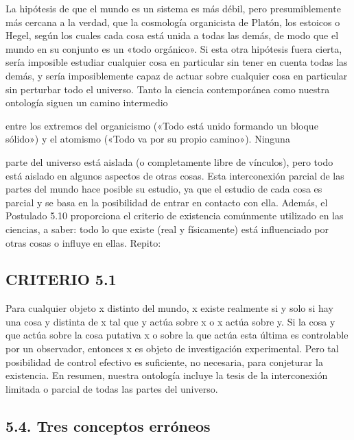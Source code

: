 \begin{justifying}
\begin{justifying}
La hipótesis de que el mundo es un sistema es más débil, pero presumiblemente
más cercana a la verdad, que la cosmología organicista de Platón, los estoicos o
Hegel, según los cuales cada cosa está unida a todas las demás, de modo que
el mundo en su conjunto es un «todo orgánico». Si esta otra hipótesis
fuera cierta, sería imposible estudiar cualquier cosa en particular
sin tener en cuenta todas las demás, y sería imposiblemente
capaz de actuar sobre cualquier cosa en particular sin perturbar todo el
universo.
Tanto la ciencia contemporánea como nuestra ontología siguen un camino intermedio

entre los extremos del organicismo («Todo está unido formando un bloque sólido»)
y el atomismo («Todo va por su propio camino»). Ninguna

parte del universo está aislada (o completamente libre de vínculos), pero todo
está aislado en algunos aspectos de otras cosas. Esta interconexión parcial
de las partes del mundo hace posible su estudio,
ya que el estudio de cada cosa es parcial y se basa en la posibilidad de
entrar en contacto con ella.
Además, el Postulado 5.10 proporciona el criterio de existencia comúnmente
utilizado en las ciencias, a saber: todo lo que existe (real y físicamente) está
influenciado por otras cosas o influye en ellas. Repito:
     \noindent
\bigskip
   \subsection{CRITERIO 5.1}
    Para cualquier objeto x distinto del mundo, x existe realmente si y solo si
hay una cosa y distinta de x tal que y actúa sobre x o x actúa sobre y.
Si la cosa y que actúa sobre la cosa putativa x o sobre la que actúa esta última es
controlable por un observador, entonces x es objeto de investigación experimental.
 Pero tal posibilidad de control efectivo es suficiente, no
necesaria, para conjeturar la existencia.
En resumen, nuestra ontología incluye la tesis de la interconexión limitada o parcial
de todas las partes del universo.
   \noindent
   \bigskip
   \subsection{ 5.4. Tres conceptos erróneos}
  

\end{justifying}
\end{justifying}
